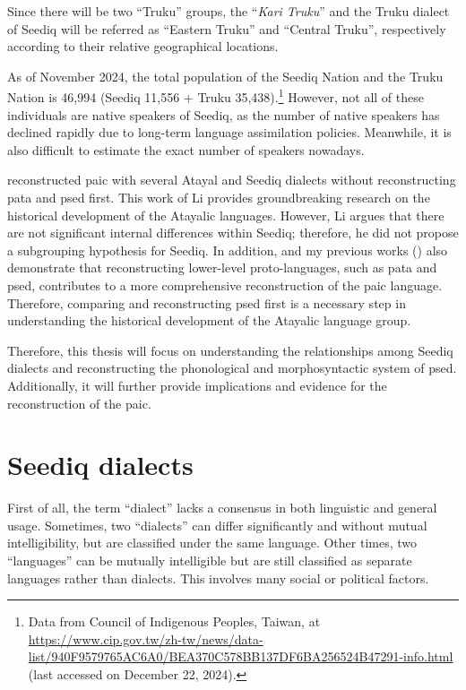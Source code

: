 Since there will be two ``Truku'' groups, the ``\textit{Kari Truku}'' and the Truku dialect of Seediq will be referred as ``Eastern Truku'' and ``Central Truku'', respectively according to their relative geographical locations.

As of November 2024, the total population of the Seediq Nation and the Truku Nation is 46,994 (Seediq 11,556 + Truku 35,438).\footnote{Data from Council of Indigenous Peoples, Taiwan, at \url{https://www.cip.gov.tw/zh-tw/news/data-list/940F9579765AC6A0/BEA370C578BB137DF6BA256524B47291-info.html} (last accessed on December 22, 2024).} However, not all of these individuals are native speakers of Seediq, as the number of native speakers has declined rapidly due to long-term language assimilation policies. Meanwhile, it is also difficult to estimate the exact number of speakers nowadays.

\textcite{li1981paic} reconstructed \ac{paic} with several Atayal and Seediq dialects without reconstructing \ac{pata} and \ac{psed} first. This work of Li provides groundbreaking research on the historical development of the Atayalic languages. However, Li argues that there are not significant internal differences within Seediq; therefore, he did not propose a subgrouping hypothesis for Seediq. In addition, \textcite{goderich2020phd} and my previous works (\cite{song2022Aicd,song2023Aicgprime,song2024Aicg}) also demonstrate that reconstructing lower-level proto-languages, such as \acl{pata} and \acl{psed}, contributes to a more comprehensive reconstruction of the \acl{paic} language. Therefore, comparing and reconstructing \acl{psed} first is a necessary step in understanding the historical development of the Atayalic language group.

Therefore, this thesis will focus on understanding the relationships among Seediq dialects and reconstructing the phonological and morphosyntactic system of \acl{psed}. Additionally, it will further provide implications and evidence for the reconstruction of the \acl{paic}.


\section{Seediq dialects}

First of all, the term ``dialect'' lacks a consensus in both linguistic and general usage. Sometimes, two ``dialects'' can differ significantly and without mutual intelligibility, but are classified under the same language. Other times, two ``languages'' can be mutually intelligible but are still classified as separate languages rather than dialects. This involves many social or political factors. 

